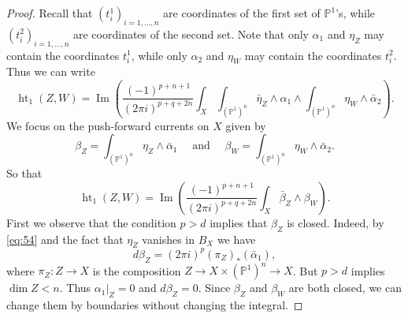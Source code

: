 \documentclass[11pt,a4paper]{amsart}
\renewcommand{\P}{\mathds{P}}
\DeclareMathOperator{\im}{Im}
\DeclareMathOperator{\Ht}{ht}
\numberwithin{equation}{section}
\theoremstyle{plain}
\theoremstyle{definition}
\begin{document}
\begin{proof}
  Recall that $(t^{1}_{i})_{i=1,\dots,n}$ are coordinates of the first set of
  $\P^{1}$'s, while $(t^{2}_{i})_{i=1,\dots,n}$ are coordinates of the
  second set. Note that only $\alpha _{1}$ and $\eta_{Z}$ may contain
  the coordinates $t_{i}^{1}$, while only $\alpha _{2}$ and $\eta_{W}$
  may contain the coordinates $t_{i}^{2}$. Thus we can write
  \begin{displaymath}
    \Ht_{1}(Z,W)=\im  \left( \frac{(-1)^{p+n+1}}{(2\pi i)^{p+q+2n}}
      \int_{X} \int_{ (\P^{1})^{n}}\bar \eta_{Z} \wedge \alpha _{1}\wedge
\int_{(\P^{1})^{n}}
        \eta_{W}\wedge 
         \bar \alpha _{2}\right).
     \end{displaymath}
We focus on the push-forward currents on $X$ given by 
\begin{displaymath}
  \beta_{Z}=\int_{ (\P^{1})^{n}}\eta_{Z} \wedge \bar \alpha _{1}\quad
    \text{ and }\quad  \beta_{W}=\int_{ (\P^{1})^{n}}\eta_{W} \wedge
    \bar  \alpha _{2}. 
\end{displaymath}
So that
\begin{displaymath}
   \Ht_{1}(Z,W)=\im  \left( \frac{(-1)^{p+n+1}}{(2\pi i)^{p+q+2n}}
      \int_{X} \bar \beta _{Z}\wedge \beta _{W}\right).
  \end{displaymath}
  First we observe that the condition $p>d$ implies that $\beta _{Z}$
  is closed. Indeed, by \eqref{eq:54} and the fact that $\eta_{Z}$
  vanishes in $B_{X}$ we have
  \begin{displaymath}
    d \beta _{Z}=(2\pi i)^{p}(\pi_{Z})_{\ast}(\bar \alpha _{1}),
  \end{displaymath}
  where $\pi _{Z}\colon Z\to X$ is the composition $Z\to X\times
  (\P^{1})^{n}\to X$. But $p>d$ implies $\dim Z <n$. Thus $\alpha
  _{1}|_{Z}=0$ and $d\beta _{Z}=0$.
  Since $\beta _{Z}$ and $\beta _{W}$ are both closed, we can
change them by boundaries without changing the integral.


\end{proof}
\end{document}
